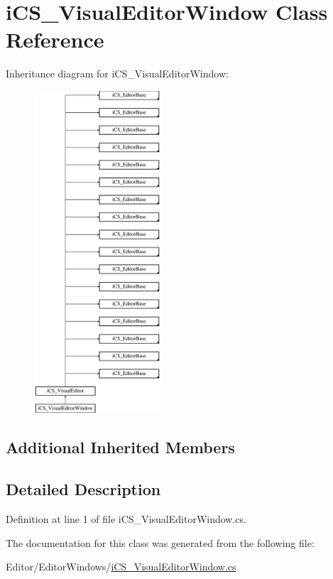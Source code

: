 \hypertarget{classi_c_s___visual_editor_window}{\section{i\+C\+S\+\_\+\+Visual\+Editor\+Window Class Reference}
\label{classi_c_s___visual_editor_window}
}
Inheritance diagram for i\+C\+S\+\_\+\+Visual\+Editor\+Window\+:\begin{figure}[H]
\begin{center}
\leavevmode
\includegraphics[height=12.000000cm]{classi_c_s___visual_editor_window}
\end{center}
\end{figure}
\subsection*{Additional Inherited Members}


\subsection{Detailed Description}


Definition at line 1 of file i\+C\+S\+\_\+\+Visual\+Editor\+Window.\+cs.



The documentation for this class was generated from the following file\+:\begin{DoxyCompactItemize}
\item 
Editor/\+Editor\+Windows/\hyperlink{i_c_s___visual_editor_window_8cs}{i\+C\+S\+\_\+\+Visual\+Editor\+Window.\+cs}\end{DoxyCompactItemize}

